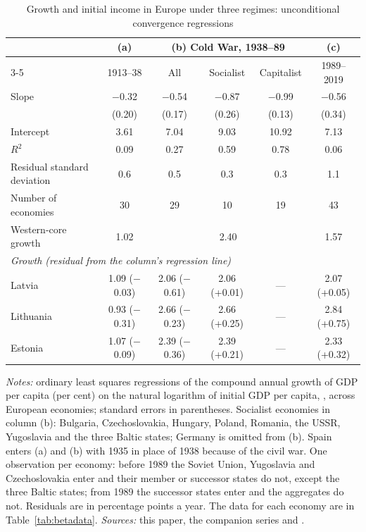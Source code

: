 \begin{table}[htbp]
\centering\footnotesize\setlength{\tabcolsep}{4pt}
\caption{Growth and initial income in Europe under three regimes: unconditional convergence regressions}
\label{tab:beta}
\begin{threeparttable}
\begin{tabular}{lccccc}
\toprule
& (a) & \multicolumn{3}{c}{(b) Cold War, 1938--89} & (c) \\
\cmidrule(lr){3-5}
& 1913--38 & All & Socialist & Capitalist & 1989--2019 \\
\midrule
Slope & $-$0.32 & $-$0.54 & $-$0.87 & $-$0.99 & $-$0.56 \\
 & (0.20) & (0.17) & (0.26) & (0.13) & (0.34) \\
Intercept & 3.61 & 7.04 & 9.03 & 10.92 & 7.13 \\
$R^2$ & 0.09 & 0.27 & 0.59 & 0.78 & 0.06 \\
Residual standard deviation & 0.6 & 0.5 & 0.3 & 0.3 & 1.1 \\
Number of economies & 30 & 29 & 10 & 19 & 43 \\
\midrule
Western-core growth & 1.02 & \multicolumn{3}{c}{2.40} & 1.57 \\
\midrule
\multicolumn{6}{l}{\textit{Growth (residual from the column's regression line)}} \\
Latvia & 1.09 ($-$0.03) & 2.06 ($-$0.61) & 2.06 (+0.01) & --- & 2.07 (+0.05) \\
Lithuania & 0.93 ($-$0.31) & 2.66 ($-$0.23) & 2.66 (+0.25) & --- & 2.84 (+0.75) \\
Estonia & 1.07 ($-$0.09) & 2.39 ($-$0.36) & 2.39 (+0.21) & --- & 2.33 (+0.32) \\
\bottomrule
\end{tabular}
\begin{tablenotes}
\footnotesize
\textit{Notes:} ordinary least squares regressions of the compound annual growth of GDP per capita (per cent) on the natural logarithm of initial GDP per capita, \intlnineteen{}, across European economies; standard errors in parentheses. Socialist economies in column (b): Bulgaria, Czechoslovakia, Hungary, Poland, Romania, the USSR, Yugoslavia and the three Baltic states; Germany is omitted from (b). Spain enters (a) and (b) with 1935 in place of 1938 because of the civil war. One observation per economy: before 1989 the Soviet Union, Yugoslavia and Czechoslovakia enter and their member or successor states do not, except the three Baltic states; from 1989 the successor states enter and the aggregates do not. Residuals are in percentage points a year. The data for each economy are in Table~\ref{tab:betadata}. \textit{Sources:} this paper, the companion series and \textcite{mpd2023}.
\end{tablenotes}
\end{threeparttable}
\end{table}
